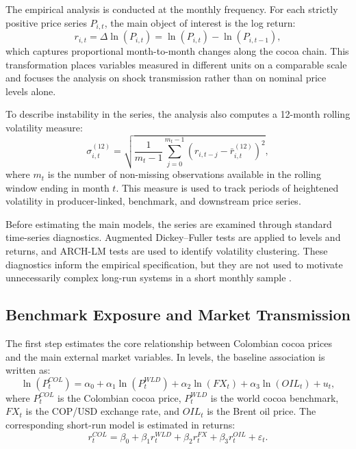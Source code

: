 \documentclass[11pt]{article}
\begin{document}
The empirical analysis is conducted at the monthly frequency. For each strictly positive price series $P_{i,t}$, the main object of interest is the log return:
\begin{equation}
r_{i,t} = \Delta \ln(P_{i,t}) = \ln(P_{i,t}) - \ln(P_{i,t-1}),
\label{eq:logreturn}
\end{equation}
which captures proportional month-to-month changes along the cocoa chain. This transformation places variables measured in different units on a comparable scale and focuses the analysis on shock transmission rather than on nominal price levels alone.

To describe instability in the series, the analysis also computes a 12-month rolling volatility measure:
\begin{equation}
\sigma_{i,t}^{(12)} =
\sqrt{\frac{1}{m_t - 1}\sum_{j=0}^{m_t-1}\left(r_{i,t-j}-\bar r_{i,t}^{(12)}\right)^2},
\label{eq:rolling_volatility}
\end{equation}
where $m_t$ is the number of non-missing observations available in the rolling window ending in month $t$. This measure is used to track periods of heightened volatility in producer-linked, benchmark, and downstream price series.

Before estimating the main models, the series are examined through standard time-series diagnostics. Augmented Dickey--Fuller tests are applied to levels and returns, and ARCH-LM tests are used to identify volatility clustering. These diagnostics inform the empirical specification, but they are not used to motivate unnecessarily complex long-run systems in a short monthly sample \citep{hakkio_rush_1991}.

\subsection{Benchmark Exposure and Market Transmission}


The first step estimates the core relationship between Colombian cocoa prices and the main external market variables. In levels, the baseline association is written as:
\begin{equation}
\ln(P^{COL}_{t}) = \alpha_0 + \alpha_1 \ln(P^{WLD}_{t}) + \alpha_2 \ln(FX_t) + \alpha_3 \ln(OIL_t) + u_t,
\label{eq:core_levels}
\end{equation}
where $P^{COL}_{t}$ is the Colombian cocoa price, $P^{WLD}_{t}$ is the world cocoa benchmark, $FX_t$ is the COP/USD exchange rate, and $OIL_t$ is the Brent oil price. The corresponding short-run model is estimated in returns:
\begin{equation}
r^{COL}_{t} = \beta_0 + \beta_1 r^{WLD}_{t} + \beta_2 r^{FX}_{t} + \beta_3 r^{OIL}_{t} + \varepsilon_t.
\label{eq:core_returns}
\end{equation}
\end{document}
